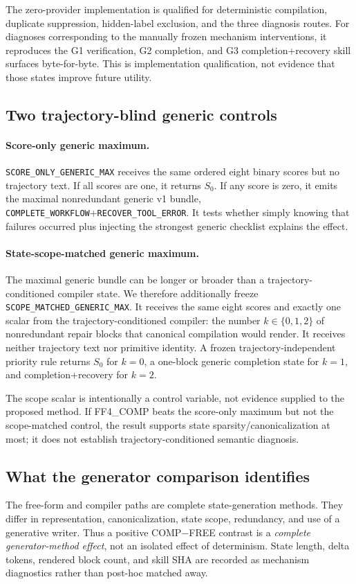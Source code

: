 The zero-provider implementation is qualified for deterministic compilation, duplicate suppression, hidden-label exclusion, and the three diagnosis routes. For diagnoses corresponding to the manually frozen mechanism interventions, it reproduces the G1 verification, G2 completion, and G3 completion+recovery skill surfaces byte-for-byte. This is implementation qualification, not evidence that those states improve future utility.

\subsection{Two trajectory-blind generic controls}

\paragraph{Score-only generic maximum.}
\texttt{SCORE\_ONLY\_GENERIC\_MAX} receives the same ordered eight binary scores but no trajectory text. If all scores are one, it returns $S_0$. If any score is zero, it emits the maximal nonredundant generic v1 bundle, \texttt{COMPLETE\_WORKFLOW}+\texttt{RECOVER\_TOOL\_ERROR}. It tests whether simply knowing that failures occurred plus injecting the strongest generic checklist explains the effect.

\paragraph{State-scope-matched generic maximum.}
The maximal generic bundle can be longer or broader than a trajectory-conditioned compiler state. We therefore additionally freeze \texttt{SCOPE\_MATCHED\_GENERIC\_MAX}. It receives the same eight scores and exactly one scalar from the trajectory-conditioned compiler: the number $k\in\{0,1,2\}$ of nonredundant repair blocks that canonical compilation would render. It receives neither trajectory text nor primitive identity. A frozen trajectory-independent priority rule returns $S_0$ for $k=0$, a one-block generic completion state for $k=1$, and completion+recovery for $k=2$.

The scope scalar is intentionally a control variable, not evidence supplied to the proposed method. If FF4\_COMP beats the score-only maximum but not the scope-matched control, the result supports state sparsity/canonicalization at most; it does not establish trajectory-conditioned semantic diagnosis.

\subsection{What the generator comparison identifies}
The free-form and compiler paths are complete state-generation methods. They differ in representation, canonicalization, state scope, redundancy, and use of a generative writer. Thus a positive COMP$-$FREE contrast is a \emph{complete generator-method effect}, not an isolated effect of determinism. State length, delta tokens, rendered block count, and skill SHA are recorded as mechanism diagnostics rather than post-hoc matched away.

